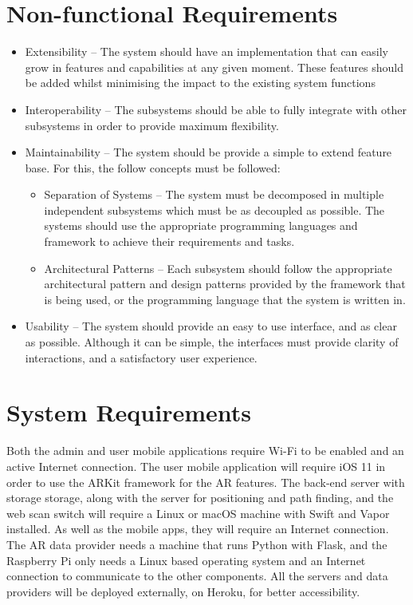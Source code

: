 \section{Non-functional Requirements}
\begin{itemize}
    \item Extensibility – The system should have an implementation that can easily grow in features and capabilities at any given moment. These features should be added whilst minimising the impact to the existing system functions
    \item Interoperability – The subsystems should be able to fully integrate with other subsystems in order to provide maximum flexibility.
    \item Maintainability – The system should be provide a simple to extend feature base. For this, the follow concepts must be followed:
        \begin{itemize}
            \item Separation of Systems – The system must be decomposed in multiple independent subsystems which must be as decoupled as possible. The systems should use the appropriate programming languages and framework to achieve their requirements and tasks.
            \item Architectural Patterns – Each subsystem should follow the appropriate architectural pattern and design patterns provided by the framework that is being used, or the programming language that the system is written in.
        \end{itemize}
    \item Usability – The system should provide an easy to use interface, and as clear as possible. Although it can be simple, the interfaces must provide clarity of interactions, and a satisfactory user experience.
\end{itemize}

\section{System Requirements}
\label{sec:system-requirements}
Both the admin and user mobile applications require Wi-Fi to be enabled and an active Internet connection. The user mobile application will require iOS 11 in order to use the ARKit framework for the AR features. The back-end server with storage storage, along with the server for positioning and path finding, and the web scan switch will require a Linux or macOS machine with Swift and Vapor installed. As well as the mobile apps, they will require an Internet connection. The AR data provider needs a machine that runs Python with Flask, and the Raspberry Pi only needs a Linux based operating system and an Internet connection to communicate to the other components. All the servers and data providers will be deployed externally, on Heroku, for better accessibility. 

